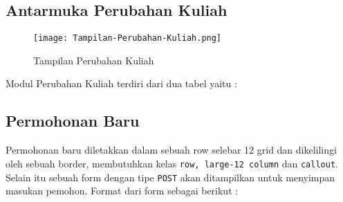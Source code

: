 \subsection{Antarmuka Perubahan Kuliah}
\begin{figure} [H]
	\centering  
	\texttt{[image: Tampilan-Perubahan-Kuliah.png]}  
	\caption{Tampilan Perubahan Kuliah} 
\end{figure}
Modul Perubahan Kuliah terdiri dari dua tabel yaitu :


\subsection{Permohonan Baru}
Permohonan baru diletakkan dalam sebuah row selebar 12 grid dan dikelilingi oleh sebuah border, membutuhkan kelas \texttt{row, large-12 column} dan \texttt{callout}. Selain itu sebuah form dengan tipe \texttt{POST} akan ditampilkan untuk menyimpan masukan pemohon. Format dari form sebagai berikut :

